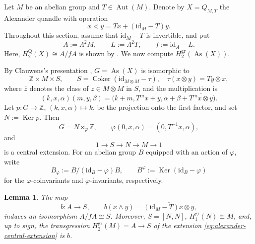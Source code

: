 \documentclass[10pt,a4paper]{amsart}
\newtheorem{lemma}[theorem]{Lemma}
\DeclareMathOperator{\As}{As}
\DeclareMathOperator{\Ker}{Ker}
\DeclareMathOperator{\Coker}{Coker}
\newcommand{\ZZ}{\mathbb Z}
\newcommand{\gr}{\mathrm{gr}}
\newcommand{\Q}{\mathrm Q}
\begin{document}
Let $M$ be an abelian group and $T\in\operatorname{Aut}(M)$. Denote by
$X=Q_{M,T}$ the Alexander quandle with operation
\[
 x\lhd y=Tx+(\mathrm{id}_M-T)y.
\]
Throughout this section, assume that $\mathrm{id}_M-T$ is invertible, and put
\[
 A:=\Lambda^2M,
 \qquad
 L:=\Lambda^2T,
 \qquad
 f:=\mathrm{id}_A-L.
\]
Here, $H_2^\Q(X)\cong A/fA$ is shown by \cite[Corollary~4.3]{BIMNP}. We now compute
$H_2^{\gr}(\As(X))$.

By Clauwens's presentation \cite[Theorem~1]{ClauwensAlexander},
$G=\As(X)$ is isomorphic to
\[
        \ZZ\times M\times S,
        \qquad
        S=\Coker(\mathrm{id}_{M\otimes M}-\tau),
        \quad \tau(x\otimes y)=Ty\otimes x,
\]
where $\overline z$ denotes the class of $z\in M\otimes M$ in $S$, and the
multiplication is
\[
(k,x,\alpha)(m,y,\beta)
 =
 \bigl(k+m,T^m x+y,
 \alpha+\beta+\overline{T^m x\otimes y}\bigr).
\]
Let
$p\colon G\to\ZZ$, $(k,x,\alpha)\mapsto k$, be the projection onto the first
factor, and set $N:=\Ker p$. Then
\[
G=N\rtimes_\varphi\ZZ,
        \qquad
        \varphi(0,x,\alpha)=(0,T^{-1}x,\alpha),
\]
and
\begin{equation}
        1\longrightarrow S\longrightarrow N\longrightarrow M\longrightarrow1
\label{eq:alexander-central-extension}
\end{equation}
is a central extension. For an abelian group $B$ equipped with an action of
$\varphi$, write
\[
 B_\varphi:=B/(\mathrm{id}_B-\varphi)B,
 \qquad
 B^\varphi:=\Ker(\mathrm{id}_B-\varphi)
\]
for the $\varphi$-coinvariants and $\varphi$-invariants, respectively.

\begin{lemma}
\label{lem:alexander-extension}
The map
\[
 b\colon A\longrightarrow S,
 \qquad
 b(x\wedge y)=\overline{(\mathrm{id}_M-T)x\otimes y},
\]
induces an isomorphism $A/fA\cong S$. Moreover,
$S=[N,N]$, $H_1^{\gr}(N)\cong M$, and, up to sign, the transgression
$H_2^{\gr}(M)=A\to S$ of the extension
\eqref{eq:alexander-central-extension} is $b$.
\end{lemma}
\end{document}
